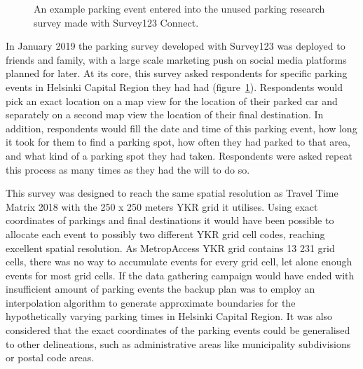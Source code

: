 \begin{figure}[H]%
    \centering
    \caption[The unused parking survey created with Survey123]{An example parking event entered into the unused parking research survey made with Survey123 Connect.}%
    \label{fig:survey123}%
\end{figure}

In January 2019 the parking survey developed with Survey123 was deployed to friends and family, with a large scale marketing push on social media platforms planned for later. At its core, this survey asked respondents for specific parking events in Helsinki Capital Region they had had (figure~\ref{fig:survey123}). Respondents would pick an exact location on a map view for the location of their parked car and separately on a second map view the location of their final destination. In addition, respondents would fill the date and time of this parking event, how long it took for them to find a parking spot, how often they had parked to that area, and what kind of a parking spot they had taken. Respondents were asked repeat this process as many times as they had the will to do so.

This survey was designed to reach the same spatial resolution as Travel Time Matrix 2018 with the 250 x 250 meters YKR grid it utilises. Using exact coordinates of parkings and final destinations it would have been possible to allocate each event to possibly two different YKR grid cell codes, reaching excellent spatial resolution. As MetropAccess YKR grid contains 13 231 grid cells, there was no way to accumulate events for every grid cell, let alone enough events for most grid cells. If the data gathering campaign would have ended with insufficient amount of parking events the backup plan was to employ an interpolation algorithm to generate approximate boundaries for the hypothetically varying parking times in Helsinki Capital Region. It was also considered that the exact coordinates of the parking events could be generalised to other delineations, such as administrative areas like municipality subdivisions or postal code areas. 

